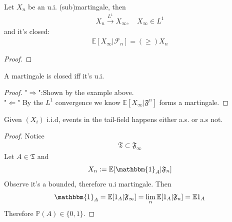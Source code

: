\begin{theorem}
	Let $X_n$ be an u.i. (sub)martingale, then 
	\begin{align*}
		X_n \overset{L^1}{\rightarrow} X_\infty, \quad X_\infty \in L^1
	\end{align*}
	and it's closed:
	\begin{align*}
		\mathbb{E}[X_\infty|\mathcal{F}_n] = (\geq) X_n
	\end{align*}
\end{theorem}
\begin{proof}
\end{proof}



\begin{corollary}
	A martingale is closed iff it's u.i.
\end{corollary}
\begin{proof}
	"$\Rightarrow$":Shown by the example above.\\
	"$\Leftarrow$" By the $L^1$ convergence we know $\mathbb{E}[X_\infty|\mathfrak{F}^n]$ forms a martingale. 
\end{proof}

\begin{corollary}
 Given $(X_i)$ i.i.d, events in the tail-field happens either a.s. or a.s not.
\end{corollary}
\begin{proof}
	Notice
	\begin{align*}
		\mathfrak{T}\subset \mathfrak{F}_\infty
	\end{align*}
	Let $A \in \mathfrak{T}$ and 
	\begin{align*}
		X_n:= \mathbb{E}[\mathbbm{1}_A |\mathfrak{F}_n]
	\end{align*}
	Observe it's a bounded, therefore u.i martingale. Then
	\begin{align*}
		\mathbbm{1}_A = \mathbb{E}[1_A|\mathfrak{F}_\infty] 
		= \lim_n \mathbb{E}[1_A|\mathfrak{F}_n] = \mathbb{E}1_A
	\end{align*}
	Therefore $\mathbb{P}(A) \in \{0, 1\}$.
\end{proof}

